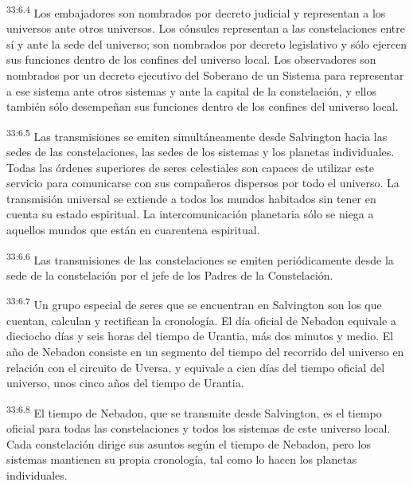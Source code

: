 \par
\textsuperscript{33:6.4} Los embajadores son nombrados por decreto judicial y representan a los universos ante otros universos. Los cónsules representan a las constelaciones entre sí y ante la sede del universo; son nombrados por decreto legislativo y sólo ejercen sus funciones dentro de los confines del universo local. Los observadores son nombrados por un decreto ejecutivo del Soberano de un Sistema para representar a ese sistema ante otros sistemas y ante la capital de la constelación, y ellos también sólo desempeñan sus funciones dentro de los confines del universo local.

\par
\textsuperscript{33:6.5} Las transmisiones se emiten simultáneamente desde Salvington hacia las sedes de las constelaciones, las sedes de los sistemas y los planetas individuales. Todas las órdenes superiores de seres celestiales son capaces de utilizar este servicio para comunicarse con sus compañeros dispersos por todo el universo. La transmisión universal se extiende a todos los mundos habitados sin tener en cuenta su estado espiritual. La intercomunicación planetaria sólo se niega a aquellos mundos que están en cuarentena espiritual.

\par
\textsuperscript{33:6.6} Las transmisiones de las constelaciones se emiten periódicamente desde la sede de la constelación por el jefe de los Padres de la Constelación.

\par
\textsuperscript{33:6.7} Un grupo especial de seres que se encuentran en Salvington son los que cuentan, calculan y rectifican la cronología. El día oficial de Nebadon equivale a dieciocho días y seis horas del tiempo de Urantia, más dos minutos y medio. El año de Nebadon consiste en un segmento del tiempo del recorrido del universo en relación con el circuito de Uversa, y equivale a cien días del tiempo oficial del universo, unos cinco años del tiempo de Urantia.

\par
\textsuperscript{33:6.8} El tiempo de Nebadon, que se transmite desde Salvington, es el tiempo oficial para todas las constelaciones y todos los sistemas de este universo local. Cada constelación dirige sus asuntos según el tiempo de Nebadon, pero los sistemas mantienen su propia cronología, tal como lo hacen los planetas individuales.

